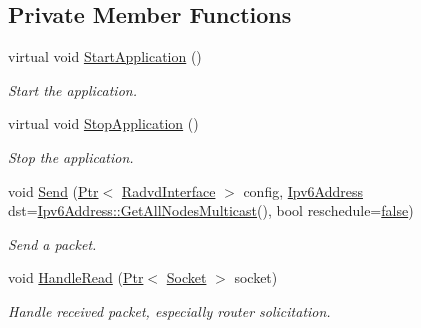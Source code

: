 \subsection*{Private Member Functions}
\begin{DoxyCompactItemize}
\item 
virtual void \hyperlink{classns3_1_1Radvd_ab3d7cd100356262e43c24e608ef1aff4}{Start\+Application} ()
\begin{DoxyCompactList}\small\item\em Start the application. \end{DoxyCompactList}\item 
virtual void \hyperlink{classns3_1_1Radvd_a8aaf0b7f7329e72a67f1293b01e60341}{Stop\+Application} ()
\begin{DoxyCompactList}\small\item\em Stop the application. \end{DoxyCompactList}\item 
void \hyperlink{classns3_1_1Radvd_a2dc4914b58690eaef190f38726d69bb2}{Send} (\hyperlink{classns3_1_1Ptr}{Ptr}$<$ \hyperlink{classns3_1_1RadvdInterface}{Radvd\+Interface} $>$ config, \hyperlink{classns3_1_1Ipv6Address}{Ipv6\+Address} dst=\hyperlink{classns3_1_1Ipv6Address_a11e6e4228d3d6e814b2c5ffc18c8ed20}{Ipv6\+Address\+::\+Get\+All\+Nodes\+Multicast}(), bool reschedule=\hyperlink{lte__cqi__generation_8m_ab1bef239d413c4da139c4bac92cd657a}{false})
\begin{DoxyCompactList}\small\item\em Send a packet. \end{DoxyCompactList}\item 
void \hyperlink{classns3_1_1Radvd_a75cc828bc07117551ab886d986590045}{Handle\+Read} (\hyperlink{classns3_1_1Ptr}{Ptr}$<$ \hyperlink{classns3_1_1Socket}{Socket} $>$ socket)
\begin{DoxyCompactList}\small\item\em Handle received packet, especially router solicitation. \end{DoxyCompactList}\end{DoxyCompactItemize}
